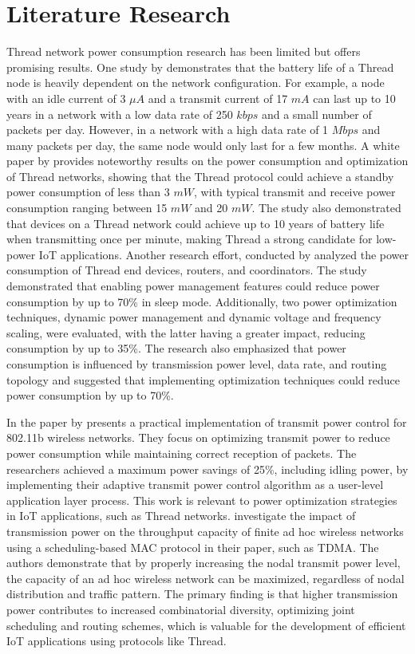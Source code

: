 \section{Literature Research}\label{sec:literature_research}

Thread network power consumption research has been limited but offers promising results. One study by \textcite{semiconductor_battery_2021} demonstrates that the battery life of a Thread node is heavily dependent on the network configuration. For example, a node with an idle current of 3 $\mu A$ and a transmit current of 17 $mA$ can last up to 10 years in a network with a low data rate of 250 $kbps$ and a small number of packets per day. However, in a network with a high data rate of 1 $Mbps$ and many packets per day, the same node would only last for a few months. A white paper by \textcite{Thread_Low_Power_2018} provides noteworthy results on the power consumption and optimization of Thread networks, showing that the Thread protocol could achieve a standby power consumption of less than 3 $mW$, with typical transmit and receive power consumption ranging between 15 $mW$ and 20 $mW$. The study also demonstrated that devices on a Thread network could achieve up to 10 years of battery life when transmitting once per minute, making Thread a strong candidate for low-power IoT applications. Another research effort, conducted by \textcite{azoidou2017battery} analyzed the power consumption of Thread end devices, routers, and coordinators. The study demonstrated that enabling power management features could reduce power consumption by up to 70\% in sleep mode. Additionally, two power optimization techniques, dynamic power management and dynamic voltage and frequency scaling, were evaluated, with the latter having a greater impact, reducing consumption by up to 35\%. The research also emphasized that power consumption is influenced by transmission power level, data rate, and routing topology and suggested that implementing optimization techniques could reduce power consumption by up to 70\%.

In the paper by \textcite{sheth2002implementation} presents a practical implementation of transmit power control for 802.11b wireless networks. They focus on optimizing transmit power to reduce power consumption while maintaining correct reception of packets. The researchers achieved a maximum power savings of 25\%, including idling power, by implementing their adaptive transmit power control algorithm as a user-level application layer process. This work is relevant to power optimization strategies in IoT applications, such as Thread networks. \textcite{1576539} investigate the impact of transmission power on the throughput capacity of finite ad hoc wireless networks using a scheduling-based MAC protocol in their paper, such as TDMA. The authors demonstrate that by properly increasing the nodal transmit power level, the capacity of an ad hoc wireless network can be maximized, regardless of nodal distribution and traffic pattern. The primary finding is that higher transmission power contributes to increased combinatorial diversity, optimizing joint scheduling and routing schemes, which is valuable for the development of efficient IoT applications using protocols like Thread.

